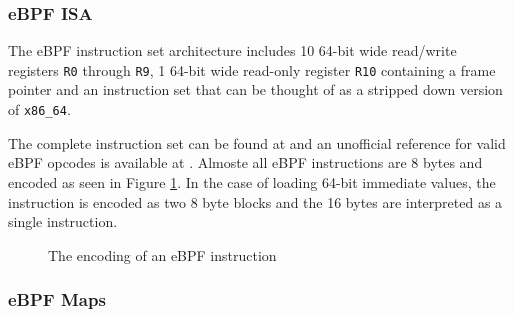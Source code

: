 \subsubsection{eBPF ISA}



The eBPF instruction set architecture includes 10 64-bit wide read/write registers \verb!R0! through \verb!R9!, 1 64-bit wide read-only register \verb!R10! containing a frame pointer and an instruction set that can be thought of as a stripped down version of \verb!x86_64!. 

The complete instruction set can be found at \cite{kernel:ebpf-inst} and an unofficial reference for valid eBPF opcodes is available at \cite{ebpf-unoff-spec}.
Almoste all eBPF instructions are 8 bytes and encoded as seen in Figure \ref{fig:ebpf-encoding}. In the case of loading 64-bit immediate values, the instruction is encoded as two 8 byte blocks and the 16 bytes are interpreted as a single instruction.


\begin{figure}[htbp!]
  \centering
  \caption{The encoding of an eBPF instruction}
  \label{fig:ebpf-encoding}
\end{figure}




\subsubsection*{eBPF Maps}

